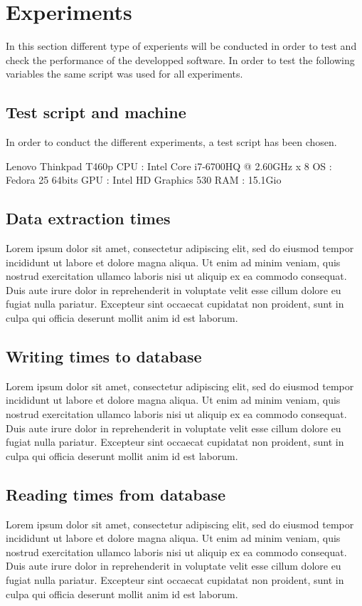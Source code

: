 \chapter{Experiments} %
\label{chap:experiments}

In this section different type of experients will be conducted in order to test and check the performance of the developped software. In order to test the following variables the same script was used for all experiments.

\section{Test script and machine}
In order to conduct the different experiments, a test script has been chosen.

Lenovo Thinkpad T460p
CPU : Intel Core i7-6700HQ @ 2.60GHz x 8
OS : Fedora 25 64bits
GPU : Intel HD Graphics 530
RAM : 15.1Gio

\section{Data extraction times}
Lorem ipsum dolor sit amet, consectetur adipiscing elit, sed do eiusmod tempor incididunt ut labore et dolore magna aliqua. Ut enim ad minim veniam, quis nostrud exercitation ullamco laboris nisi ut aliquip ex ea commodo consequat. Duis aute irure dolor in reprehenderit in voluptate velit esse cillum dolore eu fugiat nulla pariatur. Excepteur sint occaecat cupidatat non proident, sunt in culpa qui officia deserunt mollit anim id est laborum.

\section{Writing times to database}
Lorem ipsum dolor sit amet, consectetur adipiscing elit, sed do eiusmod tempor incididunt ut labore et dolore magna aliqua. Ut enim ad minim veniam, quis nostrud exercitation ullamco laboris nisi ut aliquip ex ea commodo consequat. Duis aute irure dolor in reprehenderit in voluptate velit esse cillum dolore eu fugiat nulla pariatur. Excepteur sint occaecat cupidatat non proident, sunt in culpa qui officia deserunt mollit anim id est laborum.

\section{Reading times from database}
Lorem ipsum dolor sit amet, consectetur adipiscing elit, sed do eiusmod tempor incididunt ut labore et dolore magna aliqua. Ut enim ad minim veniam, quis nostrud exercitation ullamco laboris nisi ut aliquip ex ea commodo consequat. Duis aute irure dolor in reprehenderit in voluptate velit esse cillum dolore eu fugiat nulla pariatur. Excepteur sint occaecat cupidatat non proident, sunt in culpa qui officia deserunt mollit anim id est laborum.
